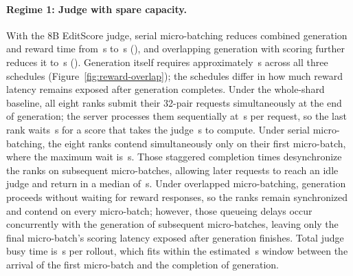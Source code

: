 \paragraph{Regime 1: Judge with spare capacity.}
With the 8B EditScore judge, serial micro-batching reduces combined generation and reward time from \RSSmallBase{}\,s to \RSSmallSerial{}\,s (\RSSmallSerialSaving{}), and overlapping generation with scoring further reduces it to \RSSmallOverlap{}\,s (\RSSmallOverlapSaving{}).
Generation itself requires approximately \RSGenEstimate{}\,s across all three schedules (Figure~\ref{fig:reward-overlap}); the schedules differ in how much reward latency remains exposed after generation completes.
Under the whole-shard baseline, all eight ranks submit their 32-pair requests simultaneously at the end of generation; the server processes them sequentially at \RSSmallWholeService{}\,s per request, so the last rank waits \RSSmallWholeWaitMax{}\,s for a score that takes the judge \RSSmallWholeService{}\,s to compute.
Under serial micro-batching, the eight ranks contend simultaneously only on their first micro-batch, where the maximum wait is \RSSmallSerialFirstWaitMax{}\,s.
Those staggered completion times desynchronize the ranks on subsequent micro-batches, allowing later requests to reach an idle judge and return in a median of \RSSmallSerialLaterWait{}\,s.
Under overlapped micro-batching, generation proceeds without waiting for reward responses, so the ranks remain synchronized and contend on every micro-batch; however, those queueing delays occur concurrently with the generation of subsequent micro-batches, leaving only the final micro-batch's scoring latency exposed after generation finishes.
Total judge busy time is \RSSmallOverlapWork{}\,s per rollout, which fits within the estimated \RSSmallOverlapWindow{}\,s window between the arrival of the first micro-batch and the completion of generation.

